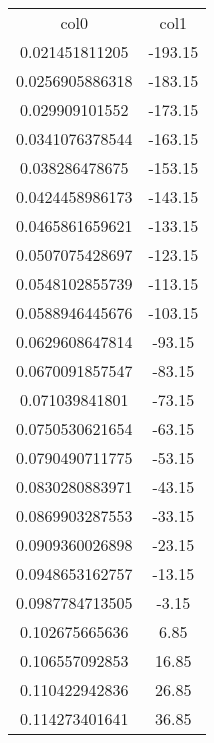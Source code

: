 \begin{table}

\begin{tabular}{cc}

col0 & col1 \\

0.021451811205  & -193.15 \\

0.0256905886318 & -183.15 \\

0.029909101552  & -173.15 \\

0.0341076378544 & -163.15 \\

0.038286478675  & -153.15 \\

0.0424458986173 & -143.15 \\

0.0465861659621 & -133.15 \\

0.0507075428697 & -123.15 \\

0.0548102855739 & -113.15 \\

0.0588946445676 & -103.15 \\

0.0629608647814 & -93.15  \\

0.0670091857547 & -83.15  \\

0.071039841801  & -73.15  \\

0.0750530621654 & -63.15  \\

0.0790490711775 & -53.15  \\

0.0830280883971 & -43.15  \\

0.0869903287553 & -33.15  \\

0.0909360026898 & -23.15  \\

0.0948653162757 & -13.15  \\

0.0987784713505 & -3.15   \\

0.102675665636  & 6.85    \\

0.106557092853  & 16.85   \\

0.110422942836  & 26.85   \\

0.114273401641  & 36.85   \\

\end{tabular}

\end{table}

